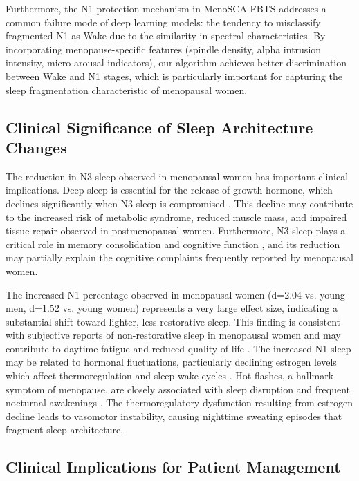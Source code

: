 \documentclass[ASNA,twocolumn]{USG}
\begin{document}
Furthermore, the N1 protection mechanism in MenoSCA-FBTS addresses a common failure mode of deep learning models: the tendency to misclassify fragmented N1 as Wake due to the similarity in spectral characteristics. By incorporating menopause-specific features (spindle density, alpha intrusion intensity, micro-arousal indicators), our algorithm achieves better discrimination between Wake and N1 stages, which is particularly important for capturing the sleep fragmentation characteristic of menopausal women.

\subsection{Clinical Significance of Sleep Architecture Changes}

The reduction in N3 sleep observed in menopausal women has important clinical implications. Deep sleep is essential for the release of growth hormone, which declines significantly when N3 sleep is compromised \cite{PoloKantola1998}. This decline may contribute to the increased risk of metabolic syndrome, reduced muscle mass, and impaired tissue repair observed in postmenopausal women. Furthermore, N3 sleep plays a critical role in memory consolidation and cognitive function \cite{Stickgold2005}, and its reduction may partially explain the cognitive complaints frequently reported by menopausal women.

The increased N1 percentage observed in menopausal women (d=2.04 vs. young men, d=1.52 vs. young women) represents a very large effect size, indicating a substantial shift toward lighter, less restorative sleep. This finding is consistent with subjective reports of non-restorative sleep in menopausal women and may contribute to daytime fatigue and reduced quality of life \cite{Baker2023}. The increased N1 sleep may be related to hormonal fluctuations, particularly declining estrogen levels which affect thermoregulation and sleep-wake cycles \cite{Kronenberg1990}. Hot flashes, a hallmark symptom of menopause, are closely associated with sleep disruption and frequent nocturnal awakenings \cite{Freedman2004}. The thermoregulatory dysfunction resulting from estrogen decline leads to vasomotor instability, causing nighttime sweating episodes that fragment sleep architecture.

\subsection{Clinical Implications for Patient Management}
\end{document}
